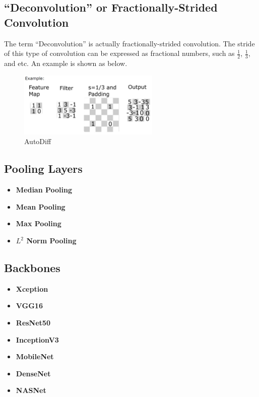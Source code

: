 \documentclass[a4paper]{article}
\begin{document}
\subsection{``Deconvolution'' or Fractionally-Strided Convolution}

The term ``Deconvolution'' is actually fractionally-strided convolution. The stride of this type of convolution can be expressed as fractional numbers, such as $\frac{1}{2}$, $\frac{1}{3}$, and etc. An example is shown as below.
\begin{figure}[h]
	\centering
	\includegraphics[width=0.6\textwidth]{images/deconv.png}
	\caption{AutoDiff}
	\label{fig:deconv2d}
\end{figure}

\subsection{Pooling Layers}

\begin{itemize}
	\item \textbf{Median Pooling}
	\item \textbf{Mean Pooling}
	\item \textbf{Max Pooling}
	\item \textbf{$L^2$ Norm Pooling}
\end{itemize}

\subsection{Backbones}

\begin{itemize}
	\item \textbf{Xception}
	\item \textbf{VGG16}
	\item \textbf{ResNet50}
	\item \textbf{InceptionV3}
	\item \textbf{MobileNet}
	\item \textbf{DenseNet}
	\item \textbf{NASNet}
\end{itemize}
\end{document}
